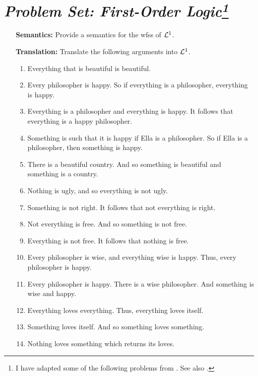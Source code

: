 \documentclass[a4paper, 11pt]{article} %
\begin{document}
\section*{\it Problem Set: First-Order Logic\footnote{I have adapted some of the following problems from \citet{Carr2013}. See also \citet{Halbach2010}.}}

\begin{enumerate}[leftmargin=1.2in,labelsep=.15in] 
\item[\bf Semantics:] Provide a semantics for the wfss of $\mathcal{L}^1$.
\item[\bf Translation:] Translate the following arguments into $\mathcal{L}^1$.
	\begin{enumerate}[label=(\arabic*)]\small
	\item Everything that is beautiful is beautiful.
	\item Every philosopher is happy. So if everything is a philosopher, everything is happy.
	\item Everything is a philosopher and everything is happy. It follows that everything is a happy philosopher.
	\item Something is such that it is happy if Ella is a philosopher. So if Ella is a philosopher, then something is happy. 
	\item There is a beautiful country. And so something is beautiful and something is a country.
	\item Nothing is ugly, and so everything is not ugly.
	\item Something is not right. It follows that not everything is right.
	\item Not everything is free. And so something is not free.
	\item Everything is not free. It follows that nothing is free.
	\item Every philosopher is wise, and everything wise is happy. Thus, every philosopher is happy.
	\item Every philosopher is happy. There is a wise philosopher. And something is wise and happy.
	\item Everything loves everything. Thus, everything loves itself.
	\item Something loves itself. And so something loves something.
	\item Nothing loves something which returns its loves.

\end{enumerate}
\end{enumerate}
\end{document}
